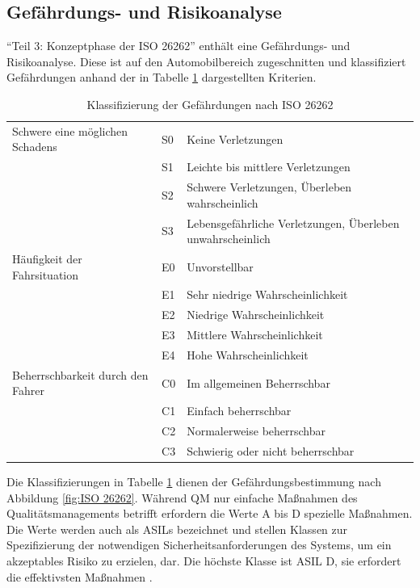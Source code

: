 
\subsection{Gefährdungs- und Risikoanalyse}
\enquote{Teil 3: Konzeptphase der ISO 26262} enthält eine Gefährdungs- und Risikoanalyse. Diese ist auf den Automobilbereich zugeschnitten und klassifiziert Gefährdungen anhand der in Tabelle \ref{tab:Kategorisierung nach ISO 26262} dargestellten Kriterien.

\begin{table}[htpb]
	\scriptsize
	\caption[Klassifizierung der Gefährdungen nach ISO 26262]{Klassifizierung der Gefährdungen nach ISO 26262 \parencite[S. 95]{Hillenbrand.2012}}\label{tab:Kategorisierung nach ISO 26262}
	\centering
	\begin{tabular}{l l p{7cm}}
		\toprule
		Schwere eine möglichen Schadens & S0 & Keine Verletzungen\\
		& S1 & Leichte bis mittlere Verletzungen\\
		& S2 & Schwere Verletzungen, Überleben wahrscheinlich\\
		& S3 & Lebensgefährliche Verletzungen, Überleben unwahrscheinlich\\
		\midrule
		Häufigkeit der Fahrsituation & E0 & Unvorstellbar\\
		& E1 & Sehr niedrige Wahrscheinlichkeit\\
		& E2 & Niedrige Wahrscheinlichkeit\\
		& E3 & Mittlere Wahrscheinlichkeit\\
		& E4 & Hohe Wahrscheinlichkeit\\
		\midrule
		Beherrschbarkeit durch den Fahrer & C0 & Im allgemeinen Beherrschbar\\
		& C1 & Einfach beherrschbar\\
		& C2 & Normalerweise beherrschbar\\
		& C3 & Schwierig oder nicht beherrschbar\\
		\bottomrule
	\end{tabular}
\end{table}

Die Klassifizierungen in Tabelle \ref{tab:Kategorisierung nach ISO 26262} dienen der Gefährdungsbestimmung nach Abbildung \ref{fig:ISO 26262}. Während QM nur einfache Maßnahmen des Qualitätsmanagements betrifft erfordern die Werte A bis D spezielle Maßnahmen. Die Werte werden auch als \acp{ASIL} bezeichnet und stellen Klassen zur Spezifizierung der notwendigen Sicherheitsanforderungen des Systems, um ein akzeptables Risiko zu erzielen, dar. Die höchste Klasse ist \acs{ASIL} D, sie erfordert die effektivsten Maßnahmen \parencite[S.94ff]{Hillenbrand.2012}.

